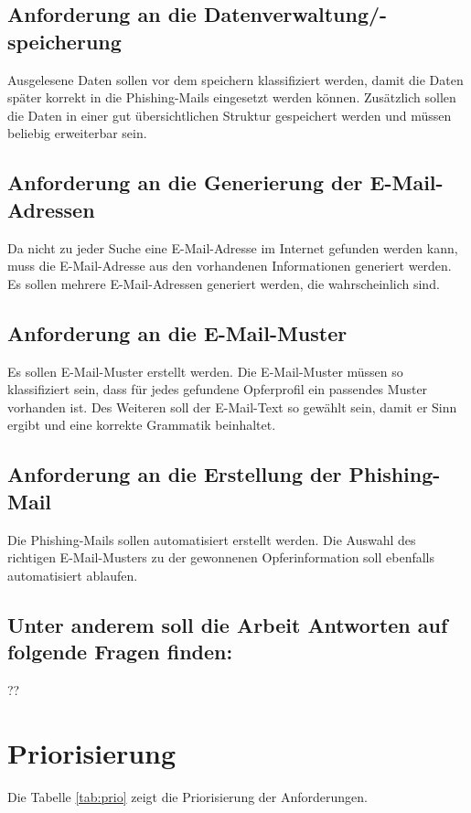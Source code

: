 	\subsection{Anforderung an die Datenverwaltung/-speicherung}
	Ausgelesene Daten sollen vor dem speichern klassifiziert werden, damit die Daten später korrekt in die Phishing-Mails eingesetzt werden können. Zusätzlich sollen die Daten in einer gut übersichtlichen Struktur gespeichert werden und müssen beliebig erweiterbar sein.
	
	\subsection{Anforderung an die Generierung der E-Mail-Adressen}
	Da nicht zu jeder Suche eine E-Mail-Adresse im Internet gefunden werden kann, muss die E-Mail-Adresse aus den vorhandenen Informationen generiert werden. Es sollen mehrere E-Mail-Adressen generiert werden, die wahrscheinlich sind.
	
	\subsection{Anforderung an die E-Mail-Muster}
	Es sollen E-Mail-Muster erstellt werden. Die E-Mail-Muster müssen so klassifiziert sein, dass für jedes gefundene Opferprofil ein passendes Muster vorhanden ist. Des Weiteren soll der E-Mail-Text so gewählt sein, damit er Sinn ergibt und eine korrekte Grammatik beinhaltet.
	
	\subsection{Anforderung an die Erstellung der Phishing-Mail}
	Die Phishing-Mails sollen automatisiert erstellt werden. Die Auswahl des richtigen E-Mail-Musters zu der gewonnenen Opferinformation soll ebenfalls automatisiert ablaufen.
	
	\subsection{Unter anderem soll die Arbeit Antworten auf folgende Fragen finden:}
	??
\FloatBarrier
\section{Priorisierung} %
\label{sec:} %
Die Tabelle \ref{tab:prio} zeigt die Priorisierung der Anforderungen.

